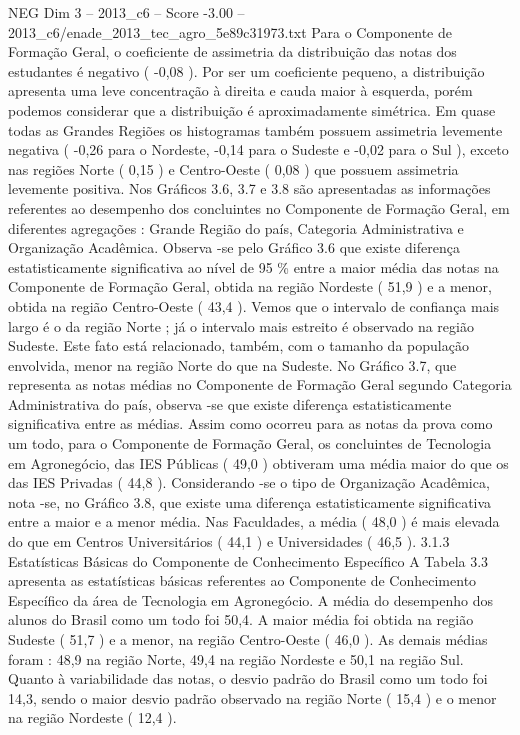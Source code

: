 \begin{textsample}{NEG Dim 3 – 2013\_c6 – Score -3.00 – 2013\_c6/enade\_2013\_tec\_agro\_5e89c31973.txt}
Para o Componente de Formação Geral, o coeficiente de assimetria da distribuição das notas dos estudantes é negativo ( -0,08 ).
Por ser um coeficiente pequeno, a distribuição apresenta uma leve concentração à direita e cauda maior à esquerda, porém podemos considerar que a distribuição é aproximadamente simétrica.
Em quase todas as Grandes Regiões os histogramas também possuem assimetria levemente negativa ( -0,26 para o Nordeste, -0,14 para o Sudeste e -0,02 para o Sul ), exceto nas regiões Norte ( 0,15 ) e Centro-Oeste ( 0,08 ) que possuem assimetria levemente positiva.
Nos Gráficos 3.6, 3.7 e 3.8 são apresentadas as informações referentes ao desempenho dos concluintes no Componente de Formação Geral, em diferentes agregações : Grande Região do país, Categoria Administrativa e Organização Acadêmica.
Observa -se pelo Gráfico 3.6 que existe diferença estatisticamente significativa ao nível de 95 \% entre a maior média das notas na Componente de Formação Geral, obtida na região Nordeste ( 51,9 ) e a menor, obtida na região Centro-Oeste ( 43,4 ).
Vemos que o intervalo de confiança mais largo é o da região Norte ; já o intervalo mais estreito é observado na região Sudeste.
Este fato está relacionado, também, com o tamanho da população envolvida, menor na região Norte do que na Sudeste.
No Gráfico 3.7, que representa as notas médias no Componente de Formação Geral segundo Categoria Administrativa do país, observa -se que existe diferença estatisticamente significativa entre as médias.
Assim como ocorreu para as notas da prova como um todo, para o Componente de Formação Geral, os concluintes de Tecnologia em Agronegócio, das IES Públicas ( 49,0 ) obtiveram uma média maior do que os das IES Privadas ( 44,8 ).
Considerando -se o tipo de Organização Acadêmica, nota -se, no Gráfico 3.8, que existe uma diferença estatisticamente significativa entre a maior e a menor média.
Nas Faculdades, a média ( 48,0 ) é mais elevada do que em Centros Universitários ( 44,1 ) e Universidades ( 46,5 ). 3.1.3 Estatísticas Básicas do Componente de Conhecimento Específico A Tabela 3.3 apresenta as estatísticas básicas referentes ao Componente de Conhecimento Específico da área de Tecnologia em Agronegócio.
A média do desempenho dos alunos do Brasil como um todo foi 50,4.
A maior média foi obtida na região Sudeste ( 51,7 ) e a menor, na região Centro-Oeste ( 46,0 ).
As demais médias foram : 48,9 na região Norte, 49,4 na região Nordeste e 50,1 na região Sul.
Quanto à variabilidade das notas, o desvio padrão do Brasil como um todo foi 14,3, sendo o maior desvio padrão observado na região Norte ( 15,4 ) e o menor na região Nordeste ( 12,4 ).

\end{textsample}
